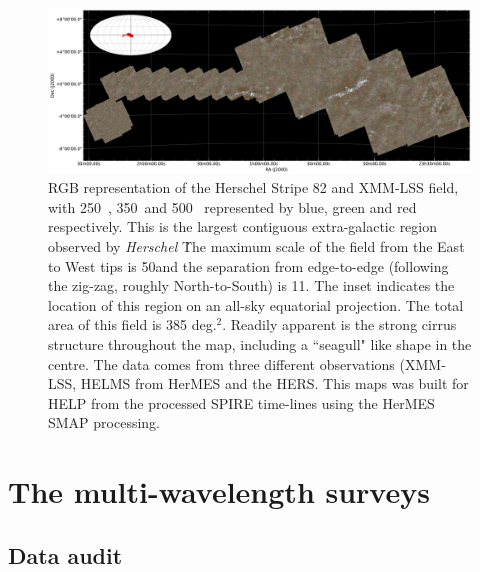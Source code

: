 \documentclass[usenatbib]{mnras}
\newcommand{\Herschel}{\textit{Herschel} }
\newcommand{\um}{\micron\  }
\begin{document}
\begin{figure}
  \centering \includegraphics[width=16cm, angle=0]{figs/helms_hers_xmm-lss-rgb-sm.pdf}

  \caption[Three-colour image of Herschel Strip 82 region]{RGB representation of
    the Herschel Stripe 82 and XMM-LSS field, with 250\um, 350\um and 500\um
    represented by blue, green and red respectively. This is the largest
    contiguous extra-galactic region observed by \Herschel\.  The maximum scale
    of the field from the East to West tips is  50\degr and the separation from
    edge-to-edge (following the zig-zag, roughly North-to-South) is 11\degr. The
    inset indicates the location of this region on an all-sky equatorial
    projection. The total area of  this field is 385 deg.$^2$. Readily apparent
    is the strong cirrus structure throughout the map, including a ``seagull"
    like shape in the centre.  The data comes from three different observations
    (XMM-LSS, HELMS from HerMES \citealt{Oliver:2012} and the HERS. This maps
    was built for HELP from the processed SPIRE time-lines using the HerMES SMAP
    processing.}\label{fig:hs82}
\end{figure}

\section[The multi-wavelength surveys.
\\ \color{red} This refers to the summary in optical NIR in Raph's paper but lists also the other surveys (i.e. at UV, X-ray, mid-IR, FIR, sub-mm and Radio) and whether or not they are included in DR1.  It might be sensible to merge this with the previous section]
{The multi-wavelength surveys}\label{sec:surveys}

\subsection[Data audit\\
{\color{red} (not needed as a separate section) A Section to define the data that will be included}]{Data audit}
\end{document}
